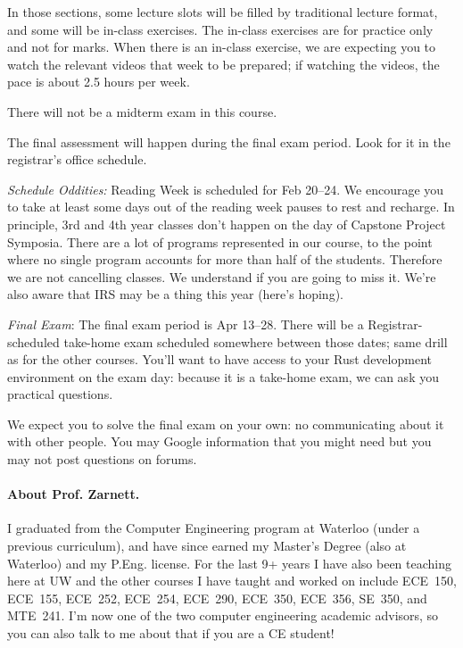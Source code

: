 In those sections, some lecture slots will be filled by traditional lecture format, and some will be in-class exercises. The in-class exercises are for practice only and not for marks. When there is an in-class exercise, we are expecting you to watch the relevant videos that week to be prepared; if watching the videos, the pace is about 2.5 hours per week.


There will not be a midterm exam in this course.
  
The final assessment will happen during the final exam period. Look for it in the registrar's office schedule.

\textit{Schedule Oddities:} Reading Week is scheduled for Feb 20--24. We encourage you to take at least some days out of the reading week pauses to rest and recharge. In principle, 3rd and 4th year classes don't happen on the day of Capstone Project Symposia. There are a lot of programs represented in our course, to the point where no single program accounts for more than half of the students. Therefore we are not cancelling classes. We understand if you are going to miss it. We're also aware that IRS may be a thing this year (here's hoping).

\textit{Final Exam}: The final exam period is Apr 13--28. There will be a Registrar-scheduled take-home exam scheduled somewhere between those dates; same drill as for the other courses. You'll want to have access to your Rust development environment on the exam day: because it is a take-home exam, we can ask you practical questions.

We expect you to solve the final exam on your own: no communicating about it with other people. You may Google information that you might need but you may not post questions on forums.


\paragraph{About Prof. Zarnett.}
I graduated from the Computer Engineering program at Waterloo (under a previous curriculum), and have since earned my Master's Degree (also at Waterloo) and my P.Eng. license. For the last 9+ years I have also been teaching here at UW and the other courses I have taught and worked on include ECE~150, ECE~155, ECE~252, ECE~254, ECE~290, ECE~350, ECE~356, SE~350, and MTE~241. I'm now one of the two computer engineering academic advisors, so you can also talk to me about that if you are a CE student! 

